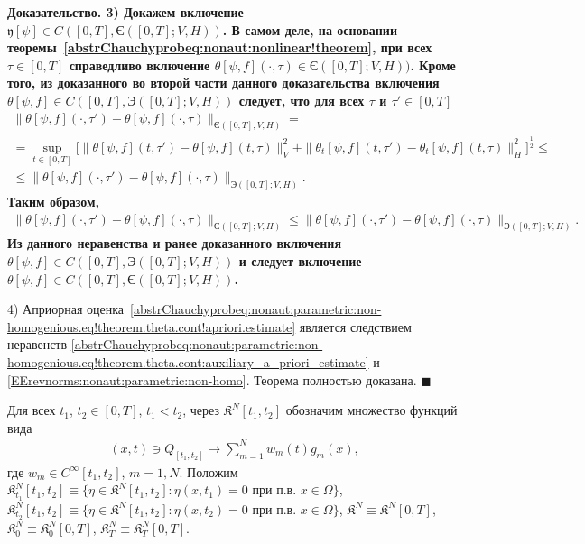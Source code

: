 \documentclass{report}
\newcounter{rem}[section]
\newcounter{theor}[section]
\newenvironment{Proof}{\par\noindent\bf Доказательство.\rm}{ $\blacksquare$\par}
\begin{document}
\begin{Proof}
3) Докажем включение $\mathfrak{y}[\psi]\in C([0,T],\textrm{Є}([0,T];V,H))$. В самом деле, на основании теоремы~\ref{abstrChauchyprobeq:nonaut:nonlinear!theorem}, при всех $\tau\in[0,T]$ справедливо включение $\theta[\psi,f](\cdot,\tau)\in \textrm{Є}([0,T];V,H))$. Кроме того, из доказанного во второй части данного доказательства включения $\theta[\psi,f]\in C([0,T],\textrm{Э}([0,T];V,H))$ следует, что для всех $\tau$ и $\tau'\in[0,T]$
\begin{gather*}
\|\theta[\psi,f](\cdot,\tau')-\theta[\psi,f](\cdot,\tau)\|_{\textrm{Є}([0,T];V,H)}=\\
=\sup\limits_{t\in[0,T]}\biggl[\|\theta[\psi,f](t,\tau')-\theta[\psi,f](t,\tau)\|_V^2+\|\theta_t[\psi,f](t,\tau')-\theta_t[\psi,f](t,\tau)\|_H^2\biggr]^{\frac12}\leqslant\\
\leqslant\|\theta[\psi,f](\cdot,\tau')-\theta[\psi,f](\cdot,\tau)\|_{\textrm{Э}([0,T];V,H)}.
\end{gather*}
Таким образом,
\begin{gather}\label{EErevnorms:nonaut:parametric:non-homo}
\|\theta[\psi,f](\cdot,\tau')-\theta[\psi,f](\cdot,\tau)\|_{\textrm{Є}([0,T];V,H)}\leqslant\|\theta[\psi,f](\cdot,\tau')-\theta[\psi,f](\cdot,\tau)\|_{\textrm{Э}([0,T];V,H)}.
\end{gather}
Из данного неравенства и ранее доказанного включения $\theta[\psi,f]\in C([0,T],\textrm{Э}([0,T];V,H))$ и следует включение $\theta[\psi,f]\in C([0,T],\textrm{Є}([0,T];V,H))$.

4) Априорная оценка~\eqref{abstrChauchyprobeq:nonaut:parametric:non-homogenious.eq!theorem.theta.cont!apriori.estimate} является следствием неравенств 
\eqref{abstrChauchyprobeq:nonaut:parametric:non-homogenious.eq!theorem.theta.cont:auxiliary_a_priori_estimate} и \eqref{EErevnorms:nonaut:parametric:non-homo}. Теорема полностью доказана.
\end{Proof}



Для всех  $t_1$, $t_2\in[0,T]$, $t_1<t_2$, через $\mathfrak{K}^N[t_1,t_2]$ обозначим множество функций вида
\begin{gather*}
(x,t)\ni Q_{[t_1,t_2]}\mapsto\sum\limits_{m=1}^Nw_m(t)g_m(x),
\end{gather*}
где $w_m\in C^\infty[t_1,t_2]$, $m=\overline{1,N}$. Положим $\mathfrak{K}^N_{t_1}[t_1,t_2]\equiv\{\eta\in\mathfrak{K}^N[t_1,t_2]:\eta(x,t_1)=0\mbox{ при п.в. $x\in\Omega$}\}$,
$\mathfrak{K}^N_{t_2}[t_1,t_2]\equiv\{\eta\in\mathfrak{K}^N[t_1,t_2]:\eta(x,t_2)=0\mbox{ при п.в. $x\in\Omega$}\}$, $\mathfrak{K}^N\equiv\mathfrak{K}^N[0,T]$, $\mathfrak{K}^N_0\equiv
\mathfrak{K}^N_0[0,T]$, $\mathfrak{K}^N_T\equiv\mathfrak{K}^N_T[0,T]$.
\end{document}
